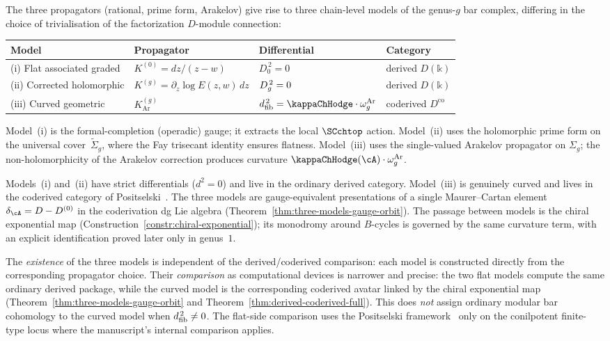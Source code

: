 \begin{remark}
\label{rem:three-models}
The three propagators (rational, prime form, Arakelov) give rise
to three chain-level models of the genus-$g$ bar complex, differing in
the choice of trivialisation of the factorization $D$-module
connection:
\begin{center}
\renewcommand{\arraystretch}{1.25}
\begin{tabular}{llll}
\textbf{Model} & \textbf{Propagator} & \textbf{Differential} &
 \textbf{Category} \\
\hline
\textup{(i)} Flat associated graded &
 $K^{(0)} = dz/(z{-}w)$ &
 $D_0^{\,2} = 0$ &
 derived $D(\mathbb{k})$ \\
\textup{(ii)} Corrected holomorphic &
 $K^{(g)} = \partial_z \log E(z,w)\,dz$ &
 $D_{g}^{\,2} = 0$ &
 derived $D(\mathbb{k})$ \\
\textup{(iii)} Curved geometric &
 $K^{(g)}_{\mathrm{Ar}}$ &
 $\dfib^{\,2} = \kappaChHodge \cdot \omega_g^{\mathrm{Ar}}$ &
 coderived $D^{\mathrm{co}}$ \\
\end{tabular}
\end{center}
Model~\textup{(i)} is the formal-completion (operadic) gauge; it
extracts the local $\SCchtop$ action. Model~\textup{(ii)} uses the
holomorphic prime form on the universal cover~$\widetilde{\Sigma}_g$,
where the Fay trisecant identity ensures flatness.
Model~\textup{(iii)} uses the single-valued Arakelov propagator on
$\Sigma_g$; the non-holomorphicity of the Arakelov correction produces
curvature $\kappaChHodge(\cA) \cdot \omega_g^{\mathrm{Ar}}$.

Models~\textup{(i)} and~\textup{(ii)} have strict differentials ($d^2 = 0$)
and live in the ordinary derived category. Model~\textup{(iii)} is
genuinely curved and lives in the coderived category of
Positselski~\cite{Positselski11}. The three models are
gauge-equivalent presentations of a single Maurer--Cartan element
$\delta_\cA = D - D^{(0)}$ in the coderivation dg Lie algebra
(Theorem~\ref{thm:three-models-gauge-orbit}). The passage between
models is the chiral exponential map
(Construction~\ref{constr:chiral-exponential}); its monodromy around
$B$-cycles is governed by the same curvature term, with an explicit
identification proved later only in genus~$1$.

The \emph{existence} of the three models is independent of the
derived/coderived comparison: each model is constructed directly
from the corresponding propagator choice. Their \emph{comparison} as
computational devices is narrower and precise: the two flat models
compute the same ordinary derived package, while the curved model is
the corresponding coderived avatar linked by the chiral exponential
map
(Theorem~\ref{thm:three-models-gauge-orbit} and
Theorem~\ref{thm:derived-coderived-full}). This does \emph{not}
assign ordinary modular bar cohomology to the curved model when
$d_{\mathrm{fib}}^{\,2}\neq 0$. The flat-side comparison uses the
Positselski framework~\cite{Positselski11} only on the conilpotent
finite-type locus where the manuscript's internal comparison applies.
\end{remark}

